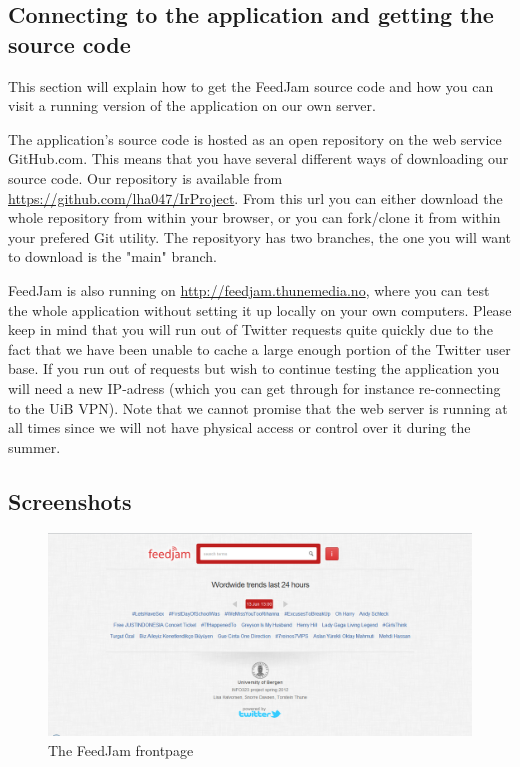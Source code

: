 \subsection{Connecting to the application and getting the source code}
This section will explain how to get the FeedJam source code and how you can visit a running version of the application on our own server.

The application's source code is hosted as an open repository on the web service GitHub.com. This means that you have several different ways of downloading our source code. Our repository is available from \url{https://github.com/lha047/IrProject}. From this url you can either download the whole repository from within your browser, or you can fork/clone it from within your prefered Git utility. The reposityory has two branches, the one you will want to download is the "main" branch.

FeedJam is also running on \url{http://feedjam.thunemedia.no}, where you can test the whole application without setting it up locally on your own computers. Please keep in mind that you will run out of Twitter requests quite quickly due to the fact that we have been unable to cache a large enough portion of the Twitter user base. If you run out of requests but wish to continue testing the application you will need a new IP-adress (which you can get through for instance re-connecting to the UiB VPN). Note that we cannot promise that the web server is running at all times since we will not have physical access or control over it during the summer. 

\subsection{Screenshots}
\begin{figure}[ht]
    \begin{minipage}[b]{1\linewidth}
        \centering
        \includegraphics[width=1\textwidth]{figures/feedjam_frontpage_screenshot}
        \caption{The FeedJam frontpage}
        \label{fig:feedjamfrontpage}
    \end{minipage}
\end{figure}

